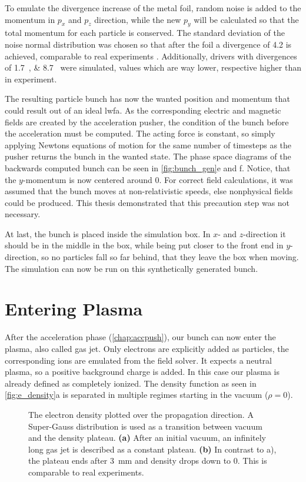 \documentclass[bachelor_thesis]{subfiles}
\begin{document}
To emulate the divergence increase of the metal foil, random noise is added to the momentum in $p_x$ and $p_z$ direction, while the new $p_y$ will be calculated so that the total momentum for each particle is conserved.
The standard deviation of the noise normal distribution was chosen so that after the foil a divergence of \qty{4.2}{\mrad} is achieved, comparable to real experiments \cite{Schoebel2022}.
Additionally, drivers with divergences of \qtylist{1.7; 8.7}{\mrad} were simulated, values which are way lower, respective higher than in experiment.

The resulting particle bunch has now the wanted position and momentum that could result out of an ideal \gls{lwfa}. As the corresponding electric and magnetic fields are created by the acceleration pusher,
the condition of the bunch before the acceleration must be computed. The acting force is constant, so simply applying Newtons equations of motion for the same number of timesteps as the pusher returns the bunch in the wanted state.
The phase space diagrams of the backwards computed bunch can be seen in \autoref {fig:bunch_gen}e and f. Notice, that the $y$-momentum is now centered around \num{0}. For correct field calculations, it was assumed that the bunch moves at non-relativistic speeds,
else nonphysical fields could be produced. This thesis demonstrated that this precaution step was not necessary. 

At last, the bunch is placed inside the simulation box. In $x$- and $z$-direction it should be in the middle in the box, while being put closer to the front end in $y$-direction, so no particles fall so far behind, that they leave the box when moving.
The simulation can now be run on this synthetically generated bunch.

\section{Entering Plasma}\label{chap:plasma}
After the acceleration phase (\autoref{chap:accpush}), our bunch can now enter the plasma, also called gas jet.
Only electrons are explicitly added as particles, the corresponding ions are emulated from the field solver. It expects a neutral plasma, so a positive background charge is added. 
In this case our plasma is already defined as completely ionized. The density function as seen in \autoref{fig:e_density}a is separated in multiple regimes starting in the vacuum ($\rho=0$). 

\begin{figure}
	\centering
	
	\caption{The electron density plotted over the propagation direction. A Super-Gauss distribution is used as a transition between vacuum and the density plateau.
	\textbf{(a)} After an initial vacuum, an infinitely long gas jet is described as a constant plateau.
	\textbf{(b)} In contrast to a), the plateau ends after \qty{3}{\mm} and density drops down to 0. This is comparable to real experiments.}
	\label{fig:e_density}
\end{figure}
\end{document}
